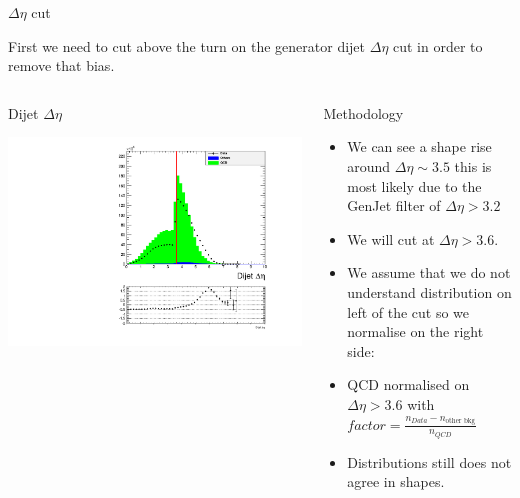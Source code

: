 \documentclass[8pt]{beamer}
\begin{document}
\begin{frame}{$\Delta\eta$ cut}

First we need to cut above the turn on the generator dijet $\Delta\eta$ cut in order to remove that bias.

\begin{columns}
 
\begin{block}{Dijet $\Delta\eta$}
 
\includegraphics[width=\linewidth]{img/NoCut/dijet_deta.pdf}
 
\end{block}

\begin{block}{Methodology}

\begin{itemize}
  \item We can see a shape rise around $\Delta\eta\sim3.5$ this is most likely due to the GenJet filter of $\Delta\eta>3.2$
  \item We will cut at $\Delta\eta>3.6$.
  \item We assume that we do not understand distribution on left of the cut so we normalise on the right side:
  \item QCD normalised on $\Delta\eta>3.6$ with $factor = \frac{n_{Data}-n_{\text{other bkg}}}{n_{QCD}}$
  \item Distributions still does not agree in shapes.
\end{itemize}

\end{block}

\end{columns}

\end{frame}
\end{document}
